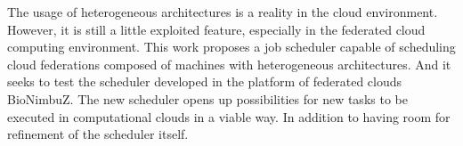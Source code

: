 The usage of heterogeneous architectures is a reality in the cloud environment. However, it is still a little exploited feature, especially in the federated cloud computing environment. This work proposes a job scheduler capable of scheduling cloud federations composed of machines with heterogeneous architectures. And it seeks to test the scheduler developed in the platform of federated clouds BioNimbuZ. The new scheduler opens up possibilities for new tasks to be executed in computational clouds in a viable way. In addition to having room for refinement of the scheduler itself.